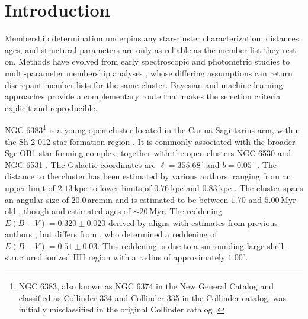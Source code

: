 \documentclass{aa}
\begin{document}


   \maketitle
\nolinenumbers

\section{Introduction}\label{S_intro}
Membership determination underpins any star-cluster characterization: distances, ages, and structural parameters are only as reliable as the member list they rest on. Methods have evolved from early spectroscopic and photometric studies \citep[e.g.,][]{1930LicOB..14..154T,1949ApJ...110..117S,1968ArA.....5....1L,1978MNRAS.182..607F} to multi-parameter membership analyses \citep{1989MNRAS.236..263P,1991MNRAS.249...76B,2005AA...438.1163K,2007AA...462..157P,2018AA...610A..30A}, whose differing assumptions can return discrepant member lists for the same cluster. Bayesian and machine-learning approaches provide a complementary route that makes the selection criteria explicit and reproducible.

NGC 6383\footnote{NGC 6383, also known as NGC 6374 in the New General Catalog \citep{2008hsf2.book..497R} and classified as Collinder 334 and Collinder 335 in the Collinder catalog, was initially misclassified in the original Collinder catalog \citep{1931AnLun...2....1C}.} is a young open cluster located in the Carina-Sagittarius arm, within the Sh 2-012 star-formation region \citep{1959ApJS....4..257S}. It is commonly associated with the broader Sgr OB1 star-forming complex, together with the open clusters NGC 6530 and NGC 6531 \citep{2008hsf2.book..497R}. The Galactic coordinates are $\ell = 355.68^{\circ}$ and $b = 0.05^{\circ}$ \citep{2017A&A...600A.106C}. The distance to the cluster has been estimated by various authors, ranging from an upper limit of $2.13~\mathrm{kpc}$ \citep{1930LicOB..14..154T} to lower limits of $0.76~\mathrm{kpc}$ \citep{1949ApJ...110..117S} and $0.83~\mathrm{kpc}$ \citep{2018AA...610A..30A}. The cluster spans an angular size of $20.0\,\mathrm{arcmin}$ \citep{2013A&A...560A..76M} and is estimated to be between $1.70$ and $5.00\,\mathrm{Myr}$ old \citep{1978MNRAS.182..607F,1989MNRAS.236..263P,2005AA...438.1163K,2007AA...462..157P}, though \citet{1968ArA.....5....1L} and \citet{1991MNRAS.249...76B} estimated ages of $\sim20\,\mathrm{Myr}$. The reddening $E(B-V) = 0.320 \pm 0.020$ derived by \citet{2008hsf2.book..497R} aligns with estimates from previous authors \citep{1971AAS....4..241B,1978MNRAS.182..607F,1978MNRAS.184..661L,1985AA...151..391T,1989MNRAS.236..263P,1994RMxAA..29..141F,2007AA...462..157P}, but differs from \citet{2018AA...610A..30A}, who determined a reddening of $E(B-V) = 0.51 \pm 0.03$. This reddening is due to a surrounding large shell-structured ionized HII region with a radius of approximately $1.00^{\circ}$.
\end{document}
